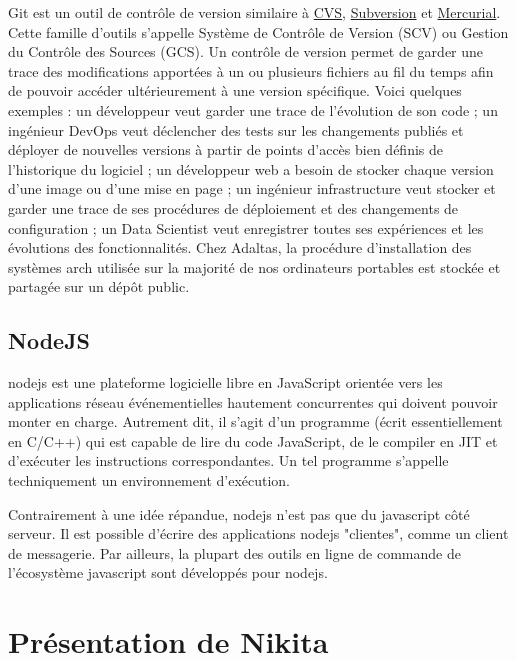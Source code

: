 \documentclass[12pt, french]{report}
\begin{document}
Git est un outil de contrôle de version similaire à \href{https://en.wikipedia.org/wiki/Concurrent_Versions_System}{CVS}, \href{https://subversion.apache.org/}{Subversion} et \href{https://www.mercurial-scm.org/}{Mercurial}. Cette famille d'outils s'appelle Système de Contrôle de Version (SCV) ou Gestion du Contrôle des Sources (GCS). Un contrôle de version permet de garder une trace des modifications apportées à un ou plusieurs fichiers au fil du temps afin de pouvoir accéder ultérieurement à une version spécifique. Voici quelques exemples : un développeur veut garder une trace de l'évolution de son code ; un ingénieur DevOps veut déclencher des tests sur les changements publiés et déployer de nouvelles versions à partir de points d'accès bien définis de l'historique du logiciel ; un développeur web a besoin de stocker chaque version d'une image ou d'une mise en page ; un ingénieur infrastructure veut stocker et garder une trace de ses procédures de déploiement et des changements de configuration ; un Data Scientist veut enregistrer toutes ses expériences et les évolutions des fonctionnalités. Chez Adaltas, la procédure d'installation des systèmes \gls{arch} utilisée sur la majorité de nos ordinateurs portables est stockée et partagée sur un dépôt public.

\subsection{NodeJS}

\gls{nodejs} est une plateforme logicielle libre en JavaScript orientée vers les applications réseau événementielles hautement concurrentes qui doivent pouvoir monter en charge. Autrement dit, il s'agit d'un programme (écrit essentiellement en C/C++) qui est capable de lire du code JavaScript, de le compiler en JIT et d’exécuter les instructions correspondantes. Un tel programme s’appelle techniquement un environnement d’exécution.

Contrairement à une idée répandue, \gls{nodejs} n’est pas que du \gls{javascript} côté serveur. Il est possible d'écrire des applications \gls{nodejs} "clientes", comme un client de messagerie. Par ailleurs, la plupart des outils en ligne de commande de l’écosystème \gls{javascript} sont développés pour \gls{nodejs}.

\section{Présentation de Nikita}
\end{document}
